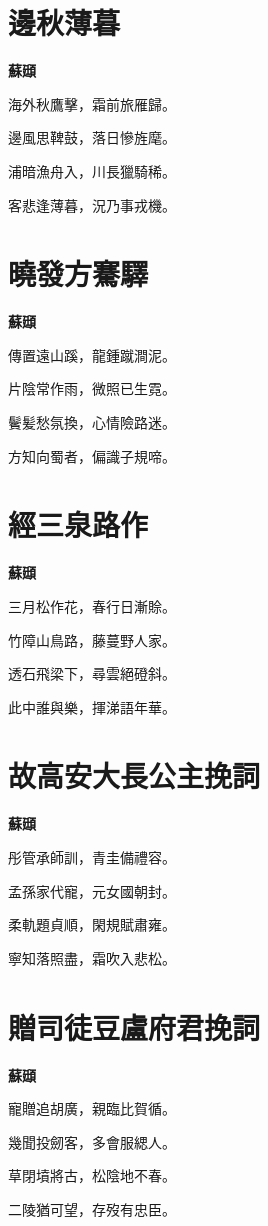 \documentclass[12pt,a4paper]{ctexbook}
\begin{document}
\section{邊秋薄暮}
\textbf{蘇頲}\par\vspace{0.5em}
海外秋鷹擊，霜前旅雁歸。\par
邊風思鞞鼓，落日慘旌麾。\par
浦暗漁舟入，川長獵騎稀。\par
客悲逢薄暮，況乃事戎機。\par

\section{曉發方騫驛}
\textbf{蘇頲}\par\vspace{0.5em}
傳置遠山蹊，龍鍾蹴澗泥。\par
片陰常作雨，微照已生霓。\par
鬢髪愁氛換，心情險路迷。\par
方知向蜀者，偏識子規啼。\par

\section{經三泉路作}
\textbf{蘇頲}\par\vspace{0.5em}
三月松作花，春行日漸賒。\par
竹障山鳥路，藤蔓野人家。\par
透石飛梁下，尋雲絕磴斜。\par
此中誰與樂，揮涕語年華。\par

\section{故高安大長公主挽詞}
\textbf{蘇頲}\par\vspace{0.5em}
彤管承師訓，青圭備禮容。\par
孟孫家代寵，元女國朝封。\par
柔軌題貞順，閑規賦肅雍。\par
寧知落照盡，霜吹入悲松。\par

\section{贈司徒豆盧府君挽詞}
\textbf{蘇頲}\par\vspace{0.5em}
寵贈追胡廣，親臨比賀循。\par
幾聞投劒客，多會服緦人。\par
草閉墳將古，松陰地不春。\par
二陵猶可望，存歿有忠臣。\par
\end{document}
